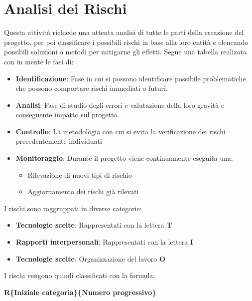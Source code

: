 \section{Analisi dei Rischi}
Questa attività richiede una attenta analisi di tutte le parti della creazione del progetto,
per poi classificare i possibili rischi in base alla loro entità e elencando possibili soluzioni o 
metodi per mitigarne gli effetti.
Segue una tabella realizata con in mente le fasi di:
\begin{itemize}
    \item \textbf{Identificazione}: Fase in cui si possono identificare possibile problematiche che possono comportare rischi immediati o futuri.
    \item \textbf{Analisi}: Fase di studio degli errori e valutazione della loro gravità e conseguente impatto sul progetto.
    \item \textbf{Controllo}: La metodologia con cui si evita la verificazione dei rischi precedentemente individuati
    \item \textbf{Monitoraggio}: Durante il progetto viene continuamente eseguita una: 
            \begin{itemize}
                \item Rilevazione di nuovi tipi di rischio
                \item Aggiornamento dei rischi già rilevati
            \end{itemize}
\end{itemize}
I rischi sono raggruppati in diverse categorie:
\begin{itemize}
    \item \textbf{Tecnologie scelte}: Rappresentati con la lettera \textbf{T}
    \item \textbf{Rapporti interpersonali}: Rappresentati con la lettera \textbf{I}
    \item \textbf{Tecnologie scelte}: Organizzazione del lavoro \textbf{O} 
\end{itemize}
I rischi vengono quindi classificati con la formula:
\begin{center}
    \textbf{R\{Iniziale categoria\}\{Numero progressivo\}}
\end{center} 
\newpage
